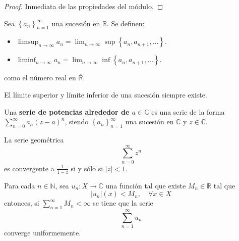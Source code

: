 \documentclass[12pt]{report}
\theoremstyle{largebreak}
\newcommand\abs[1]{\ensuremath{\left|#1\right|}}
\newcommand\cf[3]{\ensuremath{#1:#2\rightarrow#3}}
\begin{document}
    \begin{proof}
        Inmediata de las propiedades del módulo.
    \end{proof}

    \begin{mydef}
        Sea $\left\{a_n \right\}_{ n=1}^\infty$ una sucesión en $\mathbb{R}$. Se definen:
        \begin{itemize}
            \item $\limsup_{ n\rightarrow\infty}a_n=\lim_{ n\rightarrow\infty}\sup\left\{a_n,a_{ n+1},... \right\}$.
            \item $\liminf_{ n\rightarrow\infty}a_n=\lim_{ n\rightarrow\infty}\inf\left\{a_n,a_{ n+1},... \right\}$.
        \end{itemize}
        como el número real en $\overline{\mathbb{R}}$.
    \end{mydef}

    \begin{obs}
        El límite superior y límite inferior de una sucesión siempre existe.
    \end{obs}

    \begin{mydef}
        Una \textbf{serie de potencias alrededor de $a\in\mathbb{C}$} es una serie de la forma $\sum_{ n=0}^\infty a_n(z-a)^n$, siendo $\left\{ a_n \right\}_{ n=1}^\infty$ una sucesión en $\mathbb{C}$ y $z\in\mathbb{C}$.
    \end{mydef}

    \begin{exa}
        La serie geométrica
        \begin{equation*}
            \sum_{ n=0}^\infty z^n
        \end{equation*}
        es convergente a $\frac{1}{1-z}$ si y sólo si $\abs{z}<1$.
    \end{exa}

    \begin{theor}
        Para cada $n\in\mathbb{N}$, sea $\cf{u_n}{X}{\mathbb{C}}$ una función tal que existe $M_n\in\mathbb{R}$ tal que
        \begin{equation*}
            \abs{u_n}(x)<M_n,\quad\forall x\in X
        \end{equation*}
        entonces, si $\sum_{ n=1}^\infty M_n<\infty$ se tiene que la serie
        \begin{equation*}
            \sum_{ n=1}^\infty u_n
        \end{equation*}
        converge uniformemente.
    \end{theor}
\end{document}
